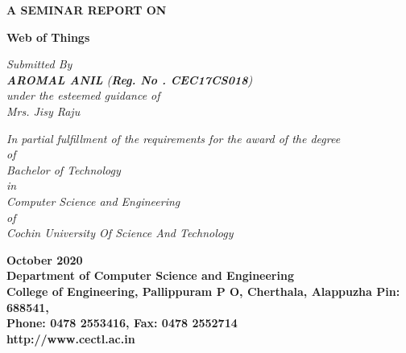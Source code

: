 \documentclass[12pt,a4paper,oneside]{report}
\begin{document}
\begin{titlepage}
\begin{center}

\large{\textbf{A SEMINAR REPORT ON}}\\
\begin{singlespace}
\LARGE{\textbf{Web of Things}}\\
\end{singlespace}


\Large{\textit{Submitted By }}\\
\Large{\textit{\textbf{AROMAL ANIL}     (\textbf{Reg. No . CEC17CS018})}}\\
\Large{\textit{\textit{under the esteemed guidance of}}}\\
\Large{\textit{Mrs. Jisy Raju}}\\
\begin{singlespace}
\large{\textit{In partial fulfillment of the requirements for the award of the degree}\\
\large{ \textit{of}}\\
\large{\textit{Bachelor of Technology} }\\
\large{\textit{in}}\\
\large{\textit{Computer Science and Engineering}}\\
\large{\textit{of}}\\
\large{\textit{Cochin University Of Science And Technology}}}\\
\end{singlespace}
\begin{figure}[h]
\begin{center}
\end{center}
\end{figure}
\begin{singlespace}

\Large{\textbf{October 2020\\Department of Computer Science and Engineering\\College of Engineering, Pallippuram P O, Cherthala, Alappuzha Pin: 688541, \\Phone: 0478 2553416, Fax: 0478 2552714\\http://www.cectl.ac.in}}
\end{singlespace}
\end{center}
\end{titlepage}
\end{document}
